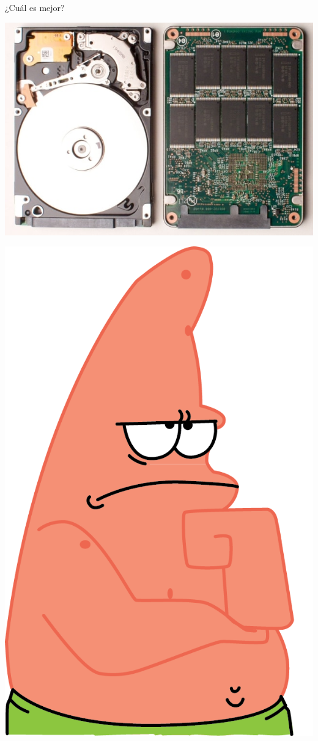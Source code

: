 \documentclass[10pt,xcolor={dvipsnames}]{beamer}
\begin{document}
\begin{frame}{¿Cuál es mejor?}
\begin{center}
\includegraphics[scale=0.4]{Figures/HHD-o-SSD}
\end{center}
\end{frame}


\begin{frame}
\begin{center}
\includegraphics[scale=0.7]{Figures/Patricio}
\end{center}
\end{frame}
\end{document}
